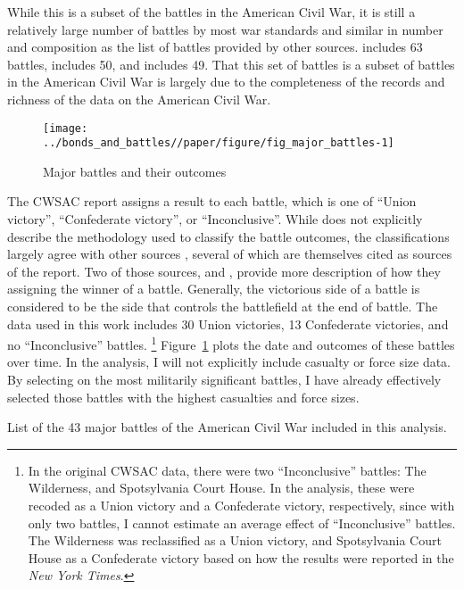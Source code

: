 While this is a subset of the battles in the American Civil War, it is still a relatively large number of battles by most war standards and similar in number and composition as the list of battles provided by other sources.
\textcite{Livermore1900} includes 63 battles, \textcite{Bodart1908} includes 50, and \textcite{cdb90} includes 49.
That this set of battles is a subset of battles in the  American Civil War is largely due to the completeness of the records and richness of the data on the American Civil War.

\begin{figure}[!htpb]
  \centering
  \texttt{[image: ../bonds\_and\_battles//paper/figure/fig\_major\_battles-1]}
  \caption{Major battles and their outcomes}
  \label{bonds:fig:major_battles}
\end{figure}

The CWSAC report \parencite{CWSAC1993b} assigns a result to each battle, which is one of ``Union victory'', ``Confederate victory'', or ``Inconclusive''.
While \textcite{CWSAC1993} does not explicitly describe the methodology used to classify the battle outcomes, the classifications largely agree with other sources \parencites{fox1898regimental}{Livermore1900}{Bodart1908}{cdb90}, several of which are themselves cited as sources of the report.
Two of those sources, \textcite{fox1898regimental} and \textcite{Livermore1900}, provide more description of how they assigning the winner of a battle.
Generally, the victorious side of a battle is considered to be the side that controls the battlefield at the end of battle.
The data used in this work includes 30 Union victories, 13 Confederate victories, and no ``Inconclusive'' battles.
\footnote{
  In the original CWSAC data, there were two ``Inconclusive'' battles: The Wilderness, and Spotsylvania Court House.
  In the analysis, these were recoded as a Union victory and a Confederate victory, respectively, since with only two battles, I cannot estimate an average effect of ``Inconclusive'' battles.
  The Wilderness was reclassified as a Union victory, and Spotsylvania Court House as a Confederate victory based on how the results were reported in the \textit{New York Times}.
}
Figure~\ref{bonds:fig:major_battles} plots the date and outcomes of these battles over time.
In the analysis, I will not explicitly include casualty or force size data.
By selecting on the most militarily significant battles, I have already effectively selected those battles with the highest casualties and force sizes.

\begin{table}
  \centering
  
  \caption{List of the 43 major battles of the American Civil War included in this analysis.}
  \label{bonds:tab:battles}
\end{table}

